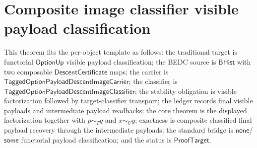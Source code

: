 \section{Composite image classifier visible payload classification}
\label{sec:option-composite-image-classifier-visible-payload-classification}

\begin{theorem}
\label{thm:tagged-option-composite-image-classifier-visible-payload-classification}
This theorem fits the per-object template as follows: the traditional target is
functorial $\mathsf{OptionUp}$ visible payload classification; the BEDC source is
$\mathsf{BHist}$ with two composable $\mathsf{DescentCertificate}$ maps; the
carrier is $\mathsf{TaggedOptionPayloadDescentImageCarrier}$; the classifier is
$\mathsf{TaggedOptionPayloadDescentImageClassifier}$; the stability obligation is
visible factorization followed by target-classifier transport; the ledger records
final visible payloads and intermediate payload readbacks; the core theorem is
the displayed factorization together with $p\sim_T q$ and $x\sim_U y$; exactness
is composite classified final payload recovery through the intermediate payloads;
the standard bridge is $\mathsf{none}$/$\mathsf{some}$ functorial payload
classification; and the status is $\mathsf{ProofTarget}$.


\end{theorem}
